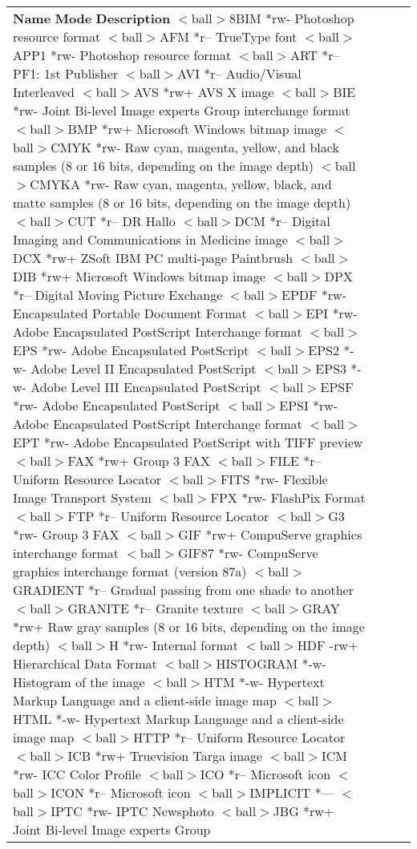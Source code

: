\begin{longtable}{llll}

{\bf Name}	{\bf Mode}	{\bf Description}
$<$ball$>$8BIM	*rw-	Photoshop resource format
$<$ball$>$AFM	*r--	TrueType font
$<$ball$>$APP1	*rw-	Photoshop resource format
$<$ball$>$ART	*r--	PF1: 1st Publisher
$<$ball$>$AVI	*r--	Audio/Visual Interleaved
$<$ball$>$AVS	*rw+	AVS X image
$<$ball$>$BIE	*rw-	Joint Bi-level Image experts Group
		interchange format
$<$ball$>$BMP	*rw+	Microsoft Windows bitmap image
$<$ball$>$CMYK	*rw-	Raw cyan, magenta, yellow, and black samples
 	 	(8 or 16 bits, depending on the image depth)
$<$ball$>$CMYKA	*rw-	Raw cyan, magenta, yellow, black, and matte
		samples (8 or 16 bits, depending on the image
		depth)
$<$ball$>$CUT	*r--	DR Hallo
$<$ball$>$DCM	*r--	Digital Imaging and Communications in
		 Medicine image
$<$ball$>$DCX	*rw+	ZSoft IBM PC multi-page Paintbrush
$<$ball$>$DIB	*rw+	Microsoft Windows bitmap image
$<$ball$>$DPX	*r--	Digital Moving Picture Exchange
$<$ball$>$EPDF	*rw-	Encapsulated Portable Document Format
$<$ball$>$EPI	*rw-	Adobe Encapsulated PostScript Interchange
		format
$<$ball$>$EPS	*rw-	Adobe Encapsulated PostScript
$<$ball$>$EPS2	*-w-	Adobe Level II Encapsulated PostScript
$<$ball$>$EPS3	*-w-	Adobe Level III Encapsulated PostScript
$<$ball$>$EPSF	*rw-	Adobe Encapsulated PostScript
$<$ball$>$EPSI	*rw-	Adobe Encapsulated PostScript Interchange
		format
$<$ball$>$EPT	*rw-	Adobe Encapsulated PostScript with TIFF
		preview
$<$ball$>$FAX	*rw+	Group 3 FAX
$<$ball$>$FILE	*r--	Uniform Resource Locator
$<$ball$>$FITS	*rw-	Flexible Image Transport System
$<$ball$>$FPX	*rw-	FlashPix Format
$<$ball$>$FTP	*r--	Uniform Resource Locator
$<$ball$>$G3	*rw-	Group 3 FAX
$<$ball$>$GIF	*rw+	CompuServe graphics interchange format
$<$ball$>$GIF87	*rw-	CompuServe graphics interchange format
		(version 87a)
$<$ball$>$GRADIENT	*r--	Gradual passing from one shade to another
$<$ball$>$GRANITE	*r--	Granite texture
$<$ball$>$GRAY	*rw+	Raw gray samples (8 or 16 bits, depending
		on the image depth)
$<$ball$>$H	*rw-	Internal format
$<$ball$>$HDF	-rw+	Hierarchical Data Format
$<$ball$>$HISTOGRAM	*-w-	Histogram of the image
$<$ball$>$HTM	*-w-	Hypertext Markup Language and a
		client-side image map
$<$ball$>$HTML	*-w-	Hypertext Markup Language and a
		client-side image map
$<$ball$>$HTTP	*r--	Uniform Resource Locator
$<$ball$>$ICB	*rw+	Truevision Targa image
$<$ball$>$ICM	*rw-	ICC Color Profile
$<$ball$>$ICO	*r--	Microsoft icon
$<$ball$>$ICON	*r--	Microsoft icon
$<$ball$>$IMPLICIT	*---	
$<$ball$>$IPTC	*rw-	IPTC Newsphoto
$<$ball$>$JBG	*rw+	Joint Bi-level Image experts Group

\end{longtable}

